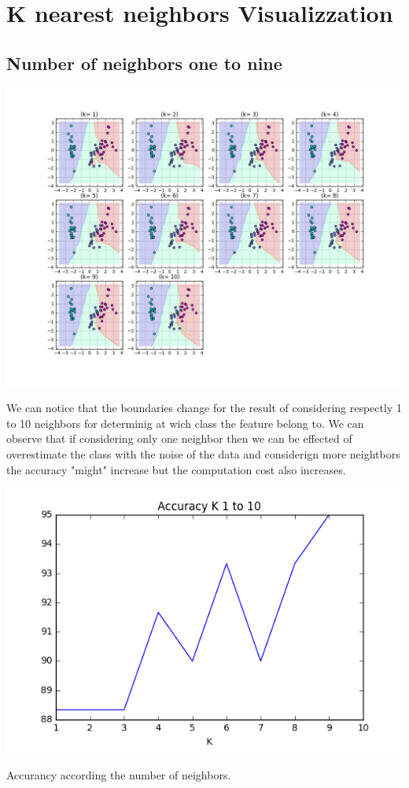 \documentclass[11pt]{article}
\theoremstyle{plain}
\begin{document}
\section{K nearest neighbors Visualizzation}


\subsection{Number of neighbors one to nine }

\begin{center}
\includegraphics[scale=0.4]{0}
\end{center}

We can notice that the boundaries change for the result of considering respectly 1 to 10 neighbors for determinig at wich class the feature belong to. We can observe that if considering only one neighbor then we can be effected of overestimate the class with the noise of the data and considerign more neightbors the accuracy "might" increase but the computation cost also increases.


\begin{center}
\includegraphics[scale=0.4]{1}
\end{center}
\begin{center}
Accurancy according the number of neighbors.
\end{center}
\end{document}
